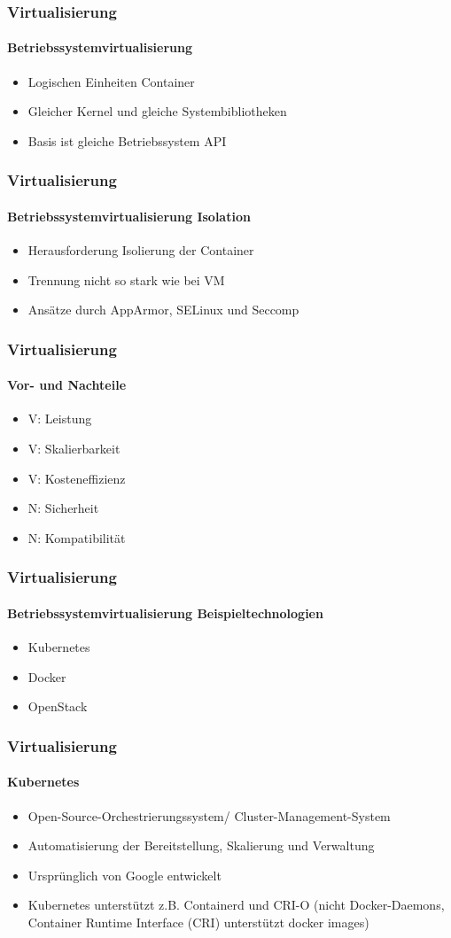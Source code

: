 \begin{frame}
  \frametitle{Virtualisierung}
  \framesubtitle{Betriebssystemvirtualisierung}
  \begin{itemize}
    \item Logischen Einheiten Container 
    \item Gleicher Kernel und gleiche Systembibliotheken
    \item Basis ist gleiche Betriebssystem API
  \end{itemize}
\end{frame}

\begin{frame}
  \frametitle{Virtualisierung}
  \framesubtitle{Betriebssystemvirtualisierung Isolation}
  \begin{itemize}
    \item Herausforderung Isolierung der Container
    \item Trennung nicht so stark wie bei VM
    \item Ansätze durch AppArmor, SELinux und Seccomp 
  \end{itemize}
\end{frame}

\begin{frame}
  \frametitle{Virtualisierung}
  \framesubtitle{Vor- und Nachteile}
  \begin{itemize}
    \item V: Leistung
    \item V: Skalierbarkeit
    \item V: Kosteneffizienz
    \item N: Sicherheit
    \item N: Kompatibilität 
  \end{itemize}
\end{frame}

\begin{frame}
  \frametitle{Virtualisierung}
  \framesubtitle{Betriebssystemvirtualisierung Beispieltechnologien}
  \begin{itemize}
    \item Kubernetes
    \item Docker
    \item OpenStack
  \end{itemize}
\end{frame}

\begin{frame}
  \frametitle{Virtualisierung}
  \framesubtitle{Kubernetes}
  \begin{itemize}
    \item Open-Source-Orchestrierungssystem/ Cluster-Management-System
    \item Automatisierung der Bereitstellung, Skalierung und Verwaltung
    \item Ursprünglich von Google entwickelt 
    \item Kubernetes unterstützt z.B. Containerd und CRI-O (nicht  Docker-Daemons, Container Runtime Interface (CRI) unterstützt docker images)
  \end{itemize}
\end{frame}

